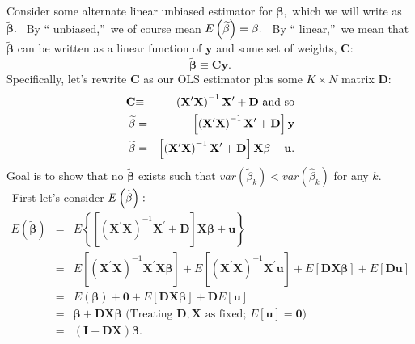 \documentclass[11pt]{article}
\begin{document}
Consider some alternate linear unbiased estimator for $\mathbf{\beta ,}$
which we will write as $\widetilde{\mathbf{\beta }}.$ \ By \textquotedblleft
unbiased,\textquotedblright\ we of course mean $E\left( \widetilde{\mathbf{%
\beta }}\right) =\mathbf{\beta }.$ \ By \textquotedblleft
linear,\textquotedblright\ we mean that $\widetilde{\mathbf{\beta }}$ can be
written as a linear function of $\mathbf{y}$ and some set of weights, $%
\mathbf{C}$:%
\begin{equation*}
\widetilde{\mathbf{\beta }}\equiv \mathbf{Cy.}
\end{equation*}%
Specifically, let's rewrite $\mathbf{C}$ as our OLS estimator plus some $%
K\times N$ matrix $\mathbf{D}$:  
\begin{eqnarray*}
\mathbf{C} &\mathbf{\equiv }&\left( \mathbf{X}^{\prime }\mathbf{X}\right)
^{-1}\mathbf{X}^{\prime }+\mathbf{D}\text{ and so} \\
\widetilde{\mathbf{\beta }} &=&\left[ \left( \mathbf{X}^{\prime }\mathbf{X}%
\right) ^{-1}\mathbf{X}^{\prime }+\mathbf{D}\right] \mathbf{y} \\
\widetilde{\mathbf{\beta }} &=&\left[ \left( \mathbf{X}^{\prime }\mathbf{X}%
\right) ^{-1}\mathbf{X}^{\prime }+\mathbf{D}\right] \mathbf{X\beta }+\mathbf{%
u.}
\end{eqnarray*}%
Goal is to show that no $\widetilde{\mathbf{\beta }}$ exists such that $%
var\left( \widetilde{\beta }_{k}\right) <var\left( \widehat{\beta }%
_{k}\right) $ for any $k.$ \ First let's consider $E\left( \widetilde{%
\mathbf{\beta }}\right) :$%
\begin{eqnarray*}
E\left( \widetilde{\mathbf{\beta }}\right)  &=&E\left\{ \left[ \left( 
\mathbf{X}^{\prime }\mathbf{X}\right) ^{-1}\mathbf{X}^{\prime }+\mathbf{D}%
\right] \mathbf{X\beta }+\mathbf{u}\right\}  \\
&=&E\left[ \left( \mathbf{X}^{\prime }\mathbf{X}\right) ^{-1}\mathbf{X}%
^{\prime }\mathbf{X\beta }\right] +E\left[ \left( \mathbf{X}^{\prime }%
\mathbf{X}\right) ^{-1}\mathbf{X}^{\prime }\mathbf{u}\right] +E\left[ 
\mathbf{DX\beta }\right] +E\left[ \mathbf{Du}\right]  \\
&=&E\left( \mathbf{\beta }\right) +\mathbf{0}+E\left[ \mathbf{DX\beta }%
\right] +\mathbf{D}E\left[ \mathbf{u}\right]  \\
&=&\mathbf{\beta +DX\beta }\text{ \ (Treating }\mathbf{D,X}\text{ as fixed; }%
E\left[ \mathbf{u}\right] =\mathbf{0}\text{)} \\
&=&\left( \mathbf{I+DX}\right) \mathbf{\beta .}
\end{eqnarray*}%
\end{document}
